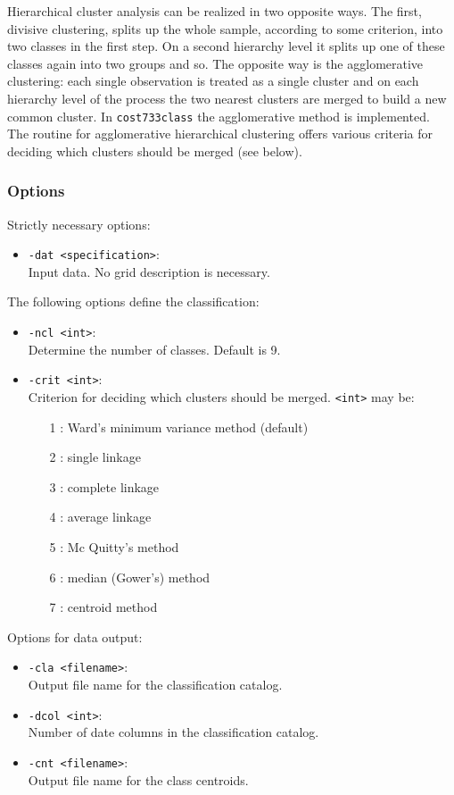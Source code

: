 \documentclass[12pt, oneside, a4paper, headsepline, plainheadsepline]{scrbook}
\begin{document}
Hierarchical cluster analysis can be realized in two opposite ways. The first,
divisive clustering, splits up the whole sample, according to some criterion,
into two classes in the first step. On a second hierarchy level it splits up 
one of these classes again into two groups and so. The opposite way is the 
agglomerative clustering: each single observation is treated as a single cluster
and on each hierarchy level of the process the two nearest clusters are merged
to build a new common cluster. In \verb+cost733class+ the agglomerative method is 
implemented.\\
The routine for agglomerative hierarchical clustering offers various criteria for
deciding which clusters should be merged (see below).

\subsubsection*{Options}
Strictly necessary options:
\begin{itemize}
 \item \verb+-dat <specification>+:\\ Input data. No grid description is necessary.
\end{itemize}
The following options define the classification:
\begin{itemize}
 \item \verb+-ncl <int>+:\\ Determine the number of classes. Default is 9.
 \item \verb+-crit <int>+:\\ Criterion for deciding which clusters should be merged. \verb+<int>+ may be:
 \begin{itemize}
  \item[1]: Ward's minimum variance method (default)
  \item[2]: single linkage
  \item[3]: complete linkage
  \item[4]: average linkage
  \item[5]: Mc Quitty's method
  \item[6]: median (Gower's) method
  \item[7]: centroid method
 \end{itemize}
\end{itemize}
Options for data output:
\begin{itemize}
 \item \verb+-cla <filename>+:\\ Output file name for the classification catalog.
 \item \verb+-dcol <int>+:\\ Number of date columns in the classification catalog.
 \item \verb+-cnt <filename>+:\\ Output file name for the class centroids.
\end{itemize}
\end{document}
